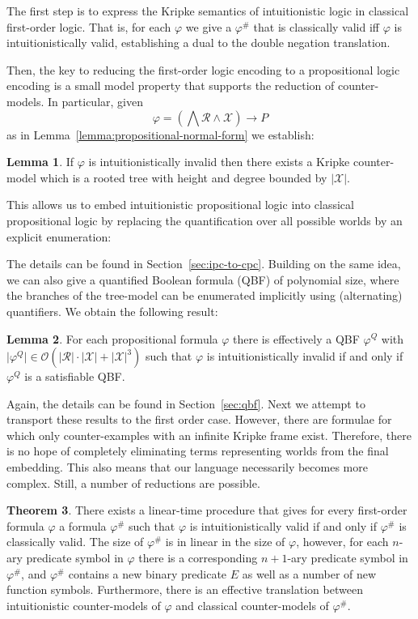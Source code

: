 \documentclass{easychair}
\theoremstyle{definition}
\newtheorem{theorem}{Theorem}[section]
\theoremstyle{definition}
\theoremstyle{definition}
\newtheorem{lemma}[theorem]{Lemma}
\theoremstyle{definition}
\theoremstyle{definition}
\theoremstyle{definition}
\theoremstyle{definition}
\begin{document}
The first step is to express the Kripke semantics of intuitionistic logic in classical first-order logic.
That is, for each $\varphi$ we give a $\varphi^\#$ that is classically valid iff $\varphi$ is intuitionistically valid, establishing a dual to the double negation translation.

Then, the key to reducing the first-order logic encoding to a propositional logic encoding is a small model property that supports the reduction of counter-models.
In particular, given $$\varphi = \left(\bigwedge\mathcal R\wedge\mathcal X\right)\to P$$ as in Lemma~\ref{lemma:propositional-normal-form} we establish:

\begin{lemma}
	If $\varphi$ is intuitionistically invalid then there exists a Kripke counter-model which is a rooted tree with height and degree bounded by $|\mathcal X|$.
\end{lemma}

This allows us to embed intuitionistic propositional logic into classical propositional logic by replacing the quantification over all possible worlds by an explicit enumeration:

The details can be found in Section~\ref{sec:ipc-to-cpc}.
Building on the same idea, we can also give a quantified Boolean formula (QBF) of polynomial size, where the branches of the tree-model can be enumerated implicitly using (alternating) quantifiers. We obtain the following result:


\begin{lemma}
	For each propositional formula $\varphi$ there is effectively a QBF $\varphi^Q$ with $\mathcal |\varphi^Q|\in\mathcal O(|\mathcal R|\cdot|\mathcal X| + |\mathcal X|^3)$ such that $\varphi$ is intuitionistically invalid if and only if $\varphi^Q$ is a satisfiable QBF.
\end{lemma}

Again, the details can be found in Section~\ref{sec:qbf}.
Next we attempt to transport these results to the first order case. However, there are formulae for which only counter-examples with an infinite Kripke frame exist. Therefore, there is no hope of completely eliminating terms representing worlds from the final embedding. This also means that our language necessarily becomes more complex. Still, a number of reductions are possible.

\begin{theorem}
	\label{thm:reduction-first-order-short}
	There exists a linear-time procedure that gives for every first-order formula $\varphi$ a formula $\varphi^\#$ such that $\varphi$ is intuitionistically valid if and only if $\varphi^\#$ is classically valid. The size of $\varphi^\#$ is in linear in the size of $\varphi$, however, for each $n$-ary predicate symbol in $\varphi$ there is a corresponding $n+1$-ary predicate symbol in $\varphi^\#$, and $\varphi^\#$ contains a new binary predicate $E$ as well as a number of new function symbols. Furthermore, there is an effective translation between intuitionistic counter-models of $\varphi$ and classical counter-models of $\varphi^\#$.
\end{theorem}
\end{document}
